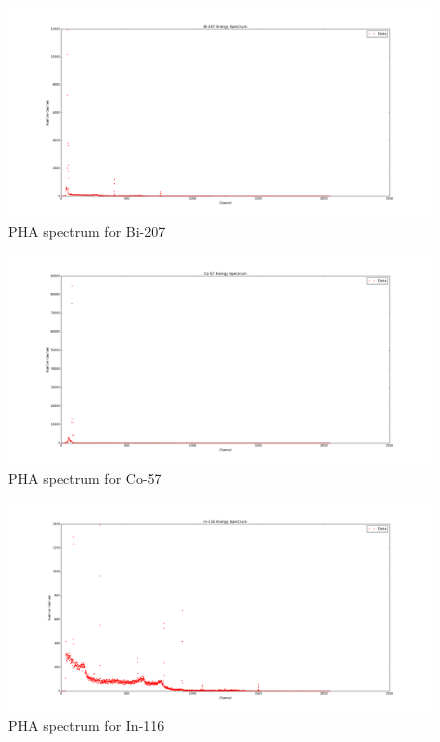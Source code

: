 \documentclass{article}
\begin{document}
\begin{figure}[!htb]
	\centering
	\includegraphics[width = 20cm]{plots/Bi-207_Spectrum.png}
  	\caption{PHA spectrum for Bi-207} 
 	\label{Bi}
\end{figure}

\begin{figure}[!htb]
	\centering
	\includegraphics[width = 20cm]{plots/Co-57_Spectrum.png}
  	\caption{PHA spectrum for Co-57} 
 	\label{Co}
\end{figure}

\begin{figure}[!htb]
	\centering
	\includegraphics[width = 20cm]{plots/In-116_Spectrum.png}
  	\caption{PHA spectrum for In-116} 
 	\label{In}
\end{figure}
\end{document}

